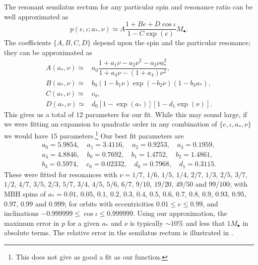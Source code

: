 The resonant semilatus rectum for any particular spin and resonance ratio can be well approximated as
\begin{equation}
p(e,\iota;a_\ast,\nu) \simeq A\dfrac{1 + B e + D \cos\iota}{1 - C\exp(e)} M_\bullet.
\end{equation}
The coefficients $\{A,B,C,D\}$ depend upon the spin and the particular resonance; they can be approximated as
\begin{align} 
A(a_\ast,\nu) \simeq {} & a_0\dfrac{1 + a_1\nu - a_2 \nu^2 - a_3 \nu a_\ast^2}{1 + a_4\nu - (1 + a_4)\nu^2}, \\
B(a_\ast,\nu) \simeq {} & b_0(1 - b_1\nu)\exp(-b_2\nu)(1 - b_3 a_\ast), \\
C(a_\ast,\nu) \simeq {} & c_0, \\
D(a_\ast,\nu) \simeq {} & d_0\left[1 - \exp(a_\ast)\right]\left[1 - d_1\exp(\nu)\right].
\end{align}
This gives us a total of $12$ parameters for our fit. While this may sound large, if we were fitting an expansion to quadratic order in any combination of $\{e,\iota,a_\ast,\nu\}$ we would have $15$ parameters.\footnote{This does not give as good a fit as our function.} Our best fit parameters are
\begin{equation}
\begin{array}{c}
a_0 = 5.9854, \quad a_1 = 3.4116, \quad a_2 = 0.9253, \quad a_3 = 0.1959, \\
a_4 = 4.8846, \quad b_0 = 0.7692, \quad b_1 = 1.4752, \quad b_2 = 1.4861, \\
b_3 = 0.5974, \quad c_0 = 0.02332, \quad d_0 = 0.7968, \quad d_1 = 0.3115.\end{array}
\end{equation} 
These were fitted for resonances with $\nu = 1/7$, $1/6$, $1/5$, $1/4$, $2/7$, $1/3$, $2/5$, $3/7$, $1/2$, $4/7$, $3/5$, $2/3$, $5/7$, $3/4$, $4/5$, $5/6$, $6/7$, $9/10$, $19/20$, $49/50$ and $99/100$; with MBH spins of $a_\ast = 0.01$, $0.05$, $0.1$, $0.2$, $0.3$, $0.4$, $0.5$, $0.6$, $0.7$, $0.8$, $0.9$, $0.93$, $0.95$, $0.97$, $0.99$ and $0.999$; for orbits with eccentricities $0.01 \leq e \leq 0.99$, and inclinations $-0.999999 \leq \cos\iota \leq 0.999999$. Using our approximation, the maximum error in $p$ for a given $a_\ast$ and $\nu$ is typically $\sim10\%$ and less that $1 M_\bullet$ in absolute terms. The relative error in the semilatus rectum is illustrated in . 
